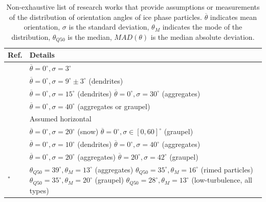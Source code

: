 \documentclass[draft]{agujournal2019}
\begin{document}
 \begin{table}
 \caption{Non-exhaustive list of research works that provide assumptions or measurements of the distribution of orientation angles of ice phase particles. $\overline{\theta}$ indicates mean orientation, $\sigma$ is the standard deviation,  $\theta_{M}$ indicates the mode of the distribution, $\theta_{Q50}$ is the median, $MAD(\theta)$ is the median absolute deviation.}
 \label{table:orientations}
 \centering
 \begin{tabular}{l p{90mm}} 
 \hline
  Ref.   & Details \\
 \hline
   \cite{Matrosov_JAM_2001} & $\overline{\theta} = 0^\circ, \sigma = 3^\circ$ \\
   \hline
   \cite{Matrosov_JAS_2005} & $\overline{\theta} = 0^\circ, \sigma = 9^\circ \pm3^\circ$ (dendrites) \\
   \hline
    \cite{Kennedy_JAMC_2011}  &   $\overline{\theta} = 0^\circ, \sigma = 15^\circ$ (dendrites) \newline $\overline{\theta} = 0^\circ, \sigma = 30^\circ$ (aggregates)     \\
   \hline
    \cite{Ryzhkov_JAMC_2011} & $\overline{\theta} = 0^\circ, \sigma = 40^\circ$ (aggregates or graupel) \\
   \hline
   \cite{Hogan_JAMC_2012} & Assumed horizontal  \\
   \hline   
   \cite{Putnam_MWR_2017} & $\overline{\theta} = 0^\circ , \sigma = 20^\circ$ (snow) \newline 
   $\overline{\theta} = 0^\circ , \sigma \in [0,60]^\circ$ (graupel) \\
   \hline
   \cite{Bukovic_JAMC_2018} &  $\overline{\theta} = 0^\circ, \sigma = 10^\circ$ (dendrites) \newline  $\overline{\theta} = 0^\circ , \sigma = 40^\circ$ (aggregates) \\
   \hline
    \cite{Matsui_JGRA_2019}  & $\overline{\theta} = 0^\circ , \sigma = 20^\circ$ (aggregates) \newline 
   $\overline{\theta} = 20^\circ , \sigma = 42^\circ$ (graupel) \\
   \hline
   \cite{Garrett_GRL_2015}$^*$ & $\theta_{Q50} = 39^\circ, \theta_{M} = 13^\circ$ (aggregates) \newline
   $\theta_{Q50} = 35^\circ, \theta_{M} = 16^\circ$ (rimed particles) \newline
   $\theta_{Q50} = 35^\circ, \theta_{M} = 20^\circ$ (graupel) \newline
   $\theta_{Q50} = 28^\circ, \theta_{M} = 13^\circ$ (low-turbulence, all types) \newline

\end{tabular}
\end{table}
\end{document}
